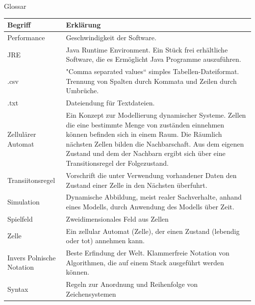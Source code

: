 \documentclass[11pt,a4paper]{article}
\begin{document}
\pagebreak


\par
Glossar
\par
\begin{longtable}[m]{|m{8cm}|m{8cm}|}
\hline
Begriff & Erklärung \\
    \hline
  Performance   & Geschwindigkeit der Software. \\
  \hline
JRE  & Java Runtime Environment. Ein Stück frei erhältliche Software, die es Ermöglicht Java Programme auszuführen. \\
    \hline
.csv  & "Comma separated values“ simples Tabellen-Dateiformat. Trennung von Spalten durch Kommata und Zeilen durch Umbrüche. \\
    \hline
.txt  & Dateiendung für Textdateien.\\
    \hline
 Zellulärer Automat & Ein Konzept zur Modellierung dynamischer Systeme.
Zellen die eine bestimmte Menge von zuständen einnehmen können befinden sich in einem Raum. Die Räumlich nächsten Zellen bilden die Nachbarschaft. Aus dem eigenen Zustand und dem der Nachbarn ergibt sich über eine Transitionsregel der Folgezustand.
\\
    \hline
 Transiitonsregel & Vorschrift die unter Verwendung vorhandener Daten den Zustand einer Zelle in den Nächsten überfuhrt.\\  
  \hline
 Simulation & Dynamische Abbildung, meist realer Sachverhalte, anhand eines Modells, durch Anwendung des Modells über Zeit.\\
  \hline
  Spielfeld & Zweidimensionales Feld aus Zellen\\
  \hline
  Zelle & Ein zellular Automat (Zelle), der einen Zustand (lebendig oder tot) annehmen kann.\\
  \hline
  Invers Polnische Notation & Beste Erfindung der Welt. Klammerfreie Notation von Algorithmen, die auf einem Stack ausgeführt werden können.\\
  \hline
  Syntax & Regeln zur Anordnung und Reihenfolge von Zeichensystemen\\
  \hline


\end{longtable}
\end{document}
